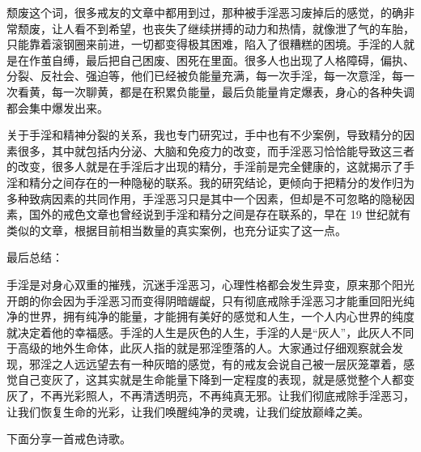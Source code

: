 颓废这个词，很多戒友的文章中都用到过，那种被手淫恶习废掉后的感觉，的确非常颓废，让人看不到希望，也丧失了继续拼搏的动力和热情，就像泄了气的车胎，只能靠着滚钢圈来前进，一切都变得极其困难，陷入了很糟糕的困境。手淫的人就是在作茧自缚，最后把自己困废、困死在里面。很多人也出现了人格障碍，偏执、分裂、反社会、强迫等，他们已经被负能量充满，每一次手淫，每一次意淫，每一次看黄，每一次聊黄，都是在积累负能量，最后负能量肯定爆表，身心的各种失调都会集中爆发出来。

关于手淫和精神分裂的关系，我也专门研究过，手中也有不少案例，导致精分的因素很多，其中就包括内分泌、大脑和免疫力的改变，而手淫恶习恰恰能导致这三者的改变，很多人就是在手淫后才出现的精分，手淫前是完全健康的，这就揭示了手淫和精分之间存在的一种隐秘的联系。我的研究结论，更倾向于把精分的发作归为多种致病因素的共同作用，手淫恶习只是其中一个因素，但却是不可忽略的隐秘因素，国外的戒色文章也曾经说到手淫和精分之间是存在联系的，早在 19 世纪就有类似的文章，根据目前相当数量的真实案例，也充分证实了这一点。

最后总结：

手淫是对身心双重的摧残，沉迷手淫恶习，心理性格都会发生异变，原来那个阳光开朗的你会因为手淫恶习而变得阴暗龌龊，只有彻底戒除手淫恶习才能重回阳光纯净的世界，拥有纯净的能量，才能拥有美好的感觉和人生，一个人内心世界的纯度就决定着他的幸福感。手淫的人生是灰色的人生，手淫的人是“灰人”，此灰人不同于高级的地外生命体，此灰人指的就是邪淫堕落的人。大家通过仔细观察就会发现，邪淫之人远远望去有一种灰暗的感觉，有的戒友会说自己被一层灰笼罩着，感觉自己变灰了，这其实就是生命能量下降到一定程度的表现，就是感觉整个人都变灰了，不再光彩照人，不再清透明亮，不再纯真无邪。让我们彻底戒除手淫恶习，让我们恢复生命的光彩，让我们唤醒纯净的灵魂，让我们绽放巅峰之美。

下面分享一首戒色诗歌。

